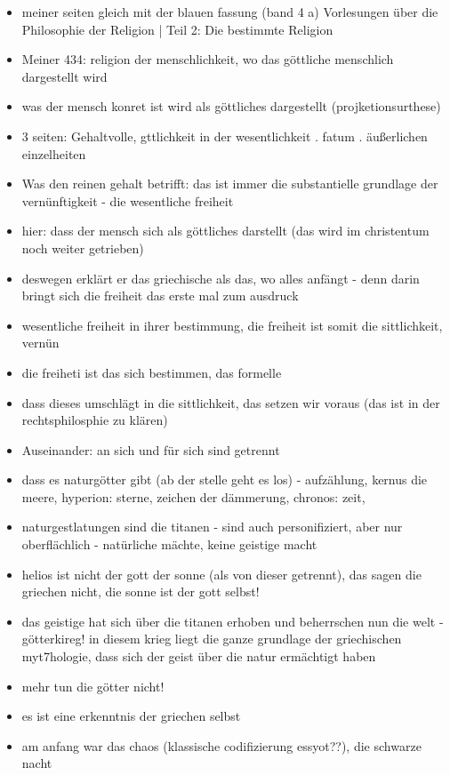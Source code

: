 \documentclass[emulatestandardclasses]{scrartcl}
\begin{document}
\begin{itemize}
  \item meiner seiten gleich mit der blauen fassung (band 4 a) Vorlesungen über die Philosophie der Religion | Teil 2: Die bestimmte Religion
  \item Meiner 434: religion der menschlichkeit, wo das göttliche menschlich dargestellt wird
  \item was der mensch konret ist wird als göttliches dargestellt (projketionsurthese)
  \item 3 seiten: Gehaltvolle, gttlichkeit in der wesentlichkeit . fatum . äußerlichen einzelheiten
  \item Was den reinen gehalt betrifft: das ist immer die substantielle grundlage der vernünftigkeit - die wesentliche freiheit
  \item hier: dass der mensch sich als göttliches darstellt (das wird im christentum noch weiter getrieben)
  \item deswegen erklärt er das griechische als das, wo alles anfängt - denn darin bringt sich die freiheit das erste mal zum ausdruck
  \item wesentliche freiheit in ihrer bestimmung, die freiheit ist somit die sittlichkeit, vernün
  \item die freiheti ist das sich bestimmen, das formelle
  \item dass dieses umschlägt in die sittlichkeit, das setzen wir voraus (das ist in der rechtsphilosphie zu klären)
  \item Auseinander: an sich und für sich sind getrennt
  \item dass es naturgötter gibt (ab der stelle geht es los) - aufzählung, kernus die meere, hyperion: sterne, zeichen der dämmerung, chronos: zeit, 
  \item naturgestlatungen sind die titanen - sind auch personifiziert, aber nur oberflächlich - natürliche mächte, keine geistige macht
  \item helios ist nicht der gott der sonne (als von dieser getrennt), das sagen die griechen nicht, die sonne ist der gott selbst!
  \item das geistige hat sich über die titanen erhoben und beherrschen nun die welt - götterkireg! in diesem krieg liegt die ganze grundlage der griechischen myt7hologie, dass sich der geist über die natur ermächtigt haben
  \item mehr tun die götter nicht!
  \item es ist eine erkenntnis der griechen selbst
  \item am anfang war das chaos (klassische codifizierung essyot??), die schwarze nacht

\end{itemize}
\end{document}
